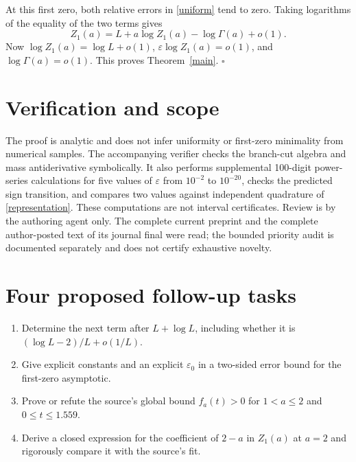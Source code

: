 \documentclass[11pt]{article}
\begin{document}
At this first zero, both relative errors in \eqref{uniform} tend
to zero. Taking logarithms of the equality of the two terms gives
\[
 Z_1(a)=L+a\log Z_1(a)-\log\Gamma(a)+o(1).
\]
Now $\log Z_1(a)=\log L+o(1)$,
$\varepsilon\log Z_1(a)=o(1)$, and $\log\Gamma(a)=o(1)$.
This proves Theorem~\ref{main}.
\hfill$\square$

\section*{Verification and scope}
The proof is analytic and does not infer uniformity or first-zero
minimality from numerical samples. The accompanying verifier checks
the branch-cut algebra and mass antiderivative symbolically. It also
performs supplemental 100-digit power-series calculations for five
values of $\varepsilon$ from $10^{-2}$ to $10^{-20}$, checks the
predicted sign transition, and compares two values against independent
quadrature of \eqref{representation}. These computations are not
interval certificates. Review is by the authoring agent only.
The complete current preprint and the complete author-posted text
of its journal final were read; the bounded priority audit is
documented separately and does not certify exhaustive novelty.

\section*{Four proposed follow-up tasks}
\begin{enumerate}[label=\textbf{Task \arabic*:},start=2,leftmargin=*]
\item Determine the next term after $L+\log L$, including whether
it is $(\log L-2)/L+o(1/L)$.
\item Give explicit constants and an explicit $\varepsilon_0$
in a two-sided error bound for the first-zero asymptotic.
\item Prove or refute the source's global bound
$f_a(t)>0$ for $1<a\leq2$ and $0\leq t\leq1.559$.
\item Derive a closed expression for the coefficient of $2-a$
in $Z_1(a)$ at $a=2$ and rigorously compare it with the source's fit.
\end{enumerate}
\end{document}
